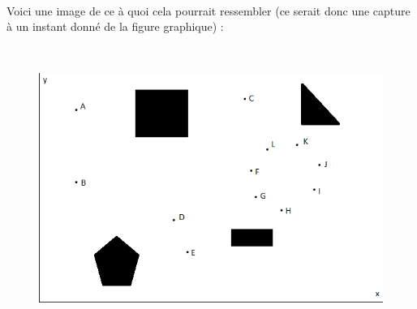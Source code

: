 \documentclass[11pt]{report}
\begin{document}
~\\
Voici une image de ce à quoi cela pourrait ressembler (ce serait donc une capture à un instant donné de la figure graphique) : 

~\\
\begin{figure}[h]
\begin{center}
\includegraphics{drones-graphique.png}
\end{center}
\end{figure}
\end{document}
